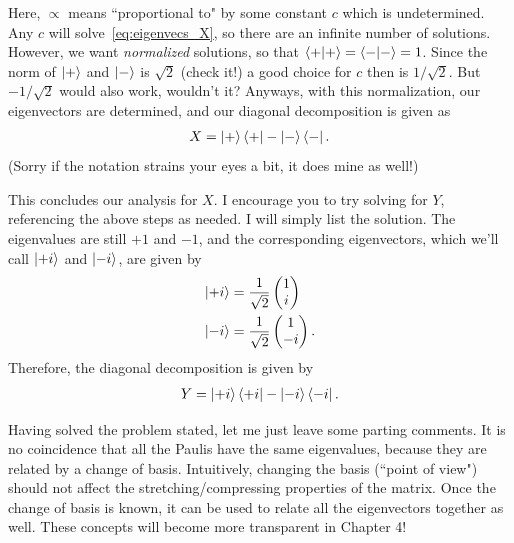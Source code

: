 \documentclass{book}
\begin{document}
    Here, $\propto$ means ``proportional to" by some constant $c$ which is undetermined. Any $c$ will solve~\eqref{eq:eigenvecs_X}, so there are an infinite number of solutions. However, we want \emph{normalized} solutions, so that $\braket{+}{+} = \braket{-}{-} = 1$. Since the norm of $\ket{+}$ and $\ket{-}$ is $\sqrt{2}$ (check it!) a good choice for $c$ then is $1/\sqrt{2}$. But $-1/\sqrt{2}$ would also work, wouldn't it? Anyways, with this normalization, our eigenvectors are determined, and our diagonal decomposition is given as 
    \begin{align}
        X = \ket{+}\bra{+} - \ket{-}\bra{-}.
    \end{align}
    (Sorry if the notation strains your eyes a bit, it does mine as well!)
    
    This concludes our analysis for $X$. I encourage you to try solving for $Y$, referencing the above steps as needed. I will simply list the solution. The eigenvalues are still $+1$ and $-1$, and the corresponding eigenvectors, which we'll call $\ket{+i}$ and $\ket{-i}$, are given by
    \begin{align}
    \begin{aligned}
        \ket{+i} &= \frac{1}{\sqrt{2}} \begin{pmatrix}
            1 \\
            i
        \end{pmatrix} \\
        \ket{-i} &= \frac{1}{\sqrt{2}} \begin{pmatrix}
            1 \\
            -i
        \end{pmatrix}.
    \end{aligned}
    \end{align}
    Therefore, the diagonal decomposition is given by
    \begin{align}
        Y = \ket{+i}\bra{+i} - \ket{-i}\bra{-i}.
    \end{align}
    
    Having solved the problem stated, let me just leave some parting comments. It is no coincidence that all the Paulis have the same eigenvalues, because they are related by a change of basis. Intuitively, changing the basis (``point of view") should not affect the stretching/compressing properties of the matrix. Once the change of basis is known, it can be used to relate all the eigenvectors together as well. These concepts will become more transparent in Chapter 4!
    
\end{document}
